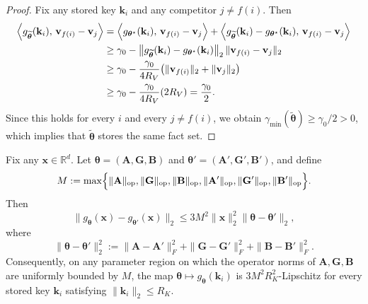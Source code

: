 \begin{proof}
Fix any stored key $\mathbf{k}_{i}$ and any competitor $j\neq f(i)$.
Then
\begin{align*}
\Bigl\langle
g_{\widetilde{\boldsymbol{\theta}}}(\mathbf{k}_{i}),\, \mathbf{v}_{f(i)}-\mathbf{v}_{j}
\Bigr\rangle
&=
\Bigl\langle
g_{\boldsymbol{\theta}^\star}(\mathbf{k}_{i}),\, \mathbf{v}_{f(i)}-\mathbf{v}_{j}
\Bigr\rangle
+
\Bigl\langle
g_{\widetilde{\boldsymbol{\theta}}}(\mathbf{k}_{i})-g_{\boldsymbol{\theta}^\star}(\mathbf{k}_{i}),\, \mathbf{v}_{f(i)}-\mathbf{v}_{j}
\Bigr\rangle \\
&\ge
\gamma_{0}
-
\bigl\|
g_{\widetilde{\boldsymbol{\theta}}}(\mathbf{k}_{i})-g_{\boldsymbol{\theta}^\star}(\mathbf{k}_{i})
\bigr\|_{2}
\,
\|\mathbf{v}_{f(i)}-\mathbf{v}_{j}\|_{2} \\
&\ge
\gamma_{0}
-
\frac{\gamma_0}{4R_V}
\bigl(\|\mathbf{v}_{f(i)}\|_{2}+\|\mathbf{v}_{j}\|_{2}\bigr) \\
&\ge
\gamma_{0}-\frac{\gamma_0}{4R_V}(2R_{V})
=
\frac{\gamma_0}{2}.
\end{align*}
Since this holds for every $i$ and every $j\neq f(i)$, we obtain $\gamma_{\min}(\widetilde{\boldsymbol{\theta}})\ge \gamma_{0}/2>0$, which implies that $\widetilde{\boldsymbol{\theta}}$ stores the same fact set.
\end{proof}

\begin{lemma}
\label{lem:bilinear_param_lipschitz_bits}
Fix any $\mathbf{x}\in\mathbb{R}^d$.
Let $\boldsymbol{\theta}=(\mathbf{A},\mathbf{G},\mathbf{B})$ and $\boldsymbol{\theta}'=(\mathbf{A}',\mathbf{G}',\mathbf{B}')$, and define
\[
M:=
\max\Bigl\{
\|\mathbf{A}\|_{\mathrm{op}},\|\mathbf{G}\|_{\mathrm{op}},\|\mathbf{B}\|_{\mathrm{op}},
\|\mathbf{A}'\|_{\mathrm{op}},\|\mathbf{G}'\|_{\mathrm{op}},\|\mathbf{B}'\|_{\mathrm{op}}
\Bigr\}.
\]
Then
\[
\bigl\|
g_{\boldsymbol{\theta}}(\mathbf{x})-g_{\boldsymbol{\theta}'}(\mathbf{x})
\bigr\|_{2}
\le
3M^2\|\mathbf{x}\|_{2}^2
\|\boldsymbol{\theta}-\boldsymbol{\theta}'\|_{2},
\]
where
\[
\|\boldsymbol{\theta}-\boldsymbol{\theta}'\|_{2}^2
:=
\|\mathbf{A}-\mathbf{A}'\|_{F}^2+\|\mathbf{G}-\mathbf{G}'\|_{F}^2+\|\mathbf{B}-\mathbf{B}'\|_{F}^2.
\]
Consequently, on any parameter region on which the operator norms of $\mathbf{A},\mathbf{G},\mathbf{B}$ are uniformly bounded by $M$, the map $\boldsymbol{\theta}\mapsto g_{\boldsymbol{\theta}}(\mathbf{k}_{i})$ is $3M^2R_{K}^2$-Lipschitz for every stored key $\mathbf{k}_{i}$ satisfying $\|\mathbf{k}_{i}\|_{2}\le R_{K}$.
\end{lemma}

